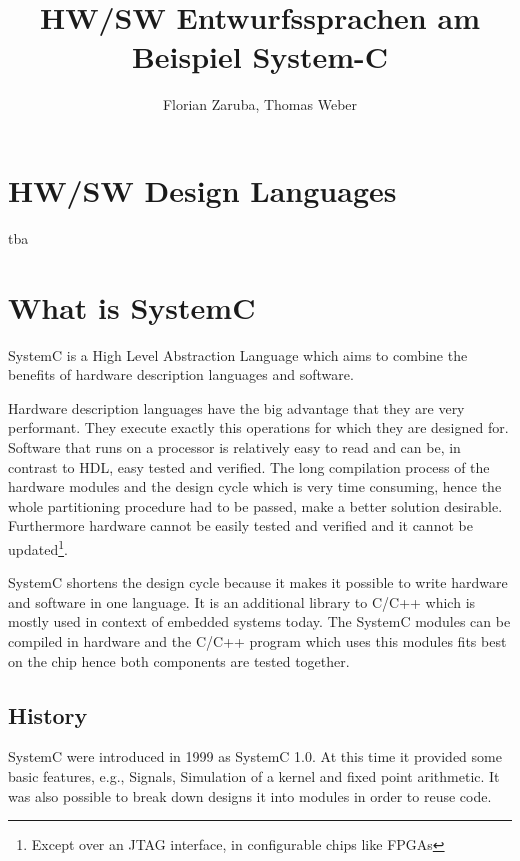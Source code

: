 \documentclass{article}
\begin{document}
	\title{HW/SW Entwurfssprachen am Beispiel System-C}
	\author{Florian Zaruba, Thomas Weber}

	\maketitle


	\section{HW/SW Design Languages}
	tba
	\section{What is SystemC}
	SystemC is a High Level Abstraction Language which aims to combine the benefits of hardware description languages and software.
	
	Hardware description languages have the big advantage that they are very performant.
	They execute exactly this operations for which they are designed for.	
	Software that runs on a processor is relatively easy to read and can be, in contrast to HDL, easy  tested and verified.	
	The long compilation process of the hardware modules and the design cycle which is very time consuming, hence the whole partitioning procedure had to be passed, make a better solution desirable.
	Furthermore hardware cannot be easily tested and verified and it cannot be updated\footnote{Except over an JTAG interface, in configurable chips like FPGAs}.
	
	SystemC shortens the design cycle because it makes it possible to write hardware and software in one language.
	It is an additional library to C/C++ which is mostly used in context of embedded systems today.
	The SystemC modules can be compiled in hardware and the C/C++ program which uses this modules fits best on the chip hence both components are tested together.
	  \subsection{History}
	    SystemC were introduced in 1999 as SystemC 1.0. At this time it provided some basic features, e.g., Signals, Simulation of a kernel and fixed point arithmetic.
	    It was also possible to break down designs it into modules in order to reuse code.
	    
\end{document}
